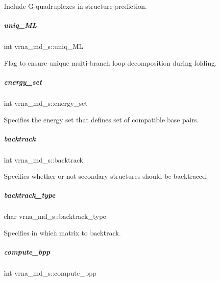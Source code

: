 Include G-\/quadruplexes in structure prediction. 

\mbox{\label{group__model__details_ade065b814a4e2e72ead93ab502613ed2}} 
\subparagraph{\texorpdfstring{uniq\+\_\+\+ML}{uniq\_ML}}
{\footnotesize\ttfamily int vrna\+\_\+md\+\_\+s\+::uniq\+\_\+\+ML}



Flag to ensure unique multi-\/branch loop decomposition during folding. 

\mbox{\label{group__model__details_a5eee4e3b468eb690d1407e0178dafb3f}} 
\subparagraph{\texorpdfstring{energy\+\_\+set}{energy\_set}}
{\footnotesize\ttfamily int vrna\+\_\+md\+\_\+s\+::energy\+\_\+set}



Specifies the energy set that defines set of compatible base pairs. 

\mbox{\label{group__model__details_a31f4471608cbdd03887f63c281823adb}} 
\subparagraph{\texorpdfstring{backtrack}{backtrack}}
{\footnotesize\ttfamily int vrna\+\_\+md\+\_\+s\+::backtrack}



Specifies whether or not secondary structures should be backtraced. 

\mbox{\label{group__model__details_abb265da25121d22ed11c8435861f0e53}} 
\subparagraph{\texorpdfstring{backtrack\+\_\+type}{backtrack\_type}}
{\footnotesize\ttfamily char vrna\+\_\+md\+\_\+s\+::backtrack\+\_\+type}



Specifies in which matrix to backtrack. 

\mbox{\label{group__model__details_aa0c3e03d9064363e27adcc92b8d0380f}} 
\subparagraph{\texorpdfstring{compute\+\_\+bpp}{compute\_bpp}}
{\footnotesize\ttfamily int vrna\+\_\+md\+\_\+s\+::compute\+\_\+bpp}




